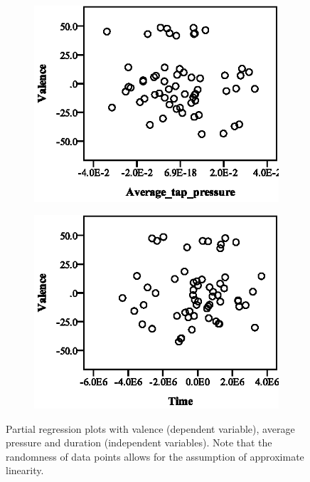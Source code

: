 \begin{figure}[ht]
  \centering
  \begin{subfigure}[b]{0.45\textwidth}
    \centering
    \includegraphics[width=\textwidth]{images/linearity/partialregression/valence/ValAvgAvg.eps}
    \label{fig:valavgavg}
  \end{subfigure}
  \quad
  \begin{subfigure}[b]{0.45\textwidth}
    \centering
    \includegraphics[width=\textwidth]{images/linearity/partialregression/valence/ValAvgTime.eps}
    \label{fig:valavgtime}
  \end{subfigure}
  \caption{Partial regression plots with valence (dependent variable), average pressure and duration (independent variables). Note that the randomness of data points allows for the assumption of approximate linearity.}
\end{figure}